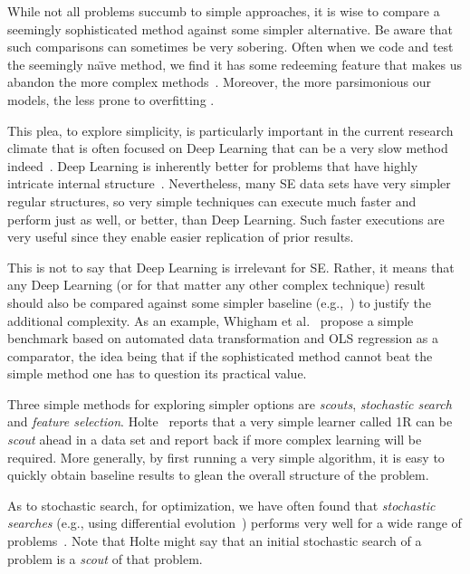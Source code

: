 \documentclass[preprint,10pt]{elsarticle}
\begin{document}
While not all problems succumb to simple approaches, it is wise to compare a seemingly sophisticated method against some simpler alternative. Be aware that such comparisons can sometimes be very sobering.  Often when we code and test the seemingly na\"{\i}ve method, we find it has some redeeming feature that makes us abandon the more complex methods~\cite{chen2018, fu2017, krishna18a}.   Moreover, the more parsimonious our models, the less prone to overfitting \cite{Hawk04}.
 
This plea, to explore simplicity, is particularly important in the current research climate that is often focused on  Deep Learning that can be a very slow method indeed~\cite{fu2017easy}. Deep Learning is inherently better for problems that have highly intricate internal structure~\cite{lecun2015deep}. Nevertheless, many SE data sets have very simpler regular structures, so very simple techniques can execute much faster and perform just as well, or better, than Deep Learning. Such faster executions are very useful since they enable easier replication of prior results.

This is not to say that Deep Learning is irrelevant for SE. Rather, it means that any Deep Learning (or for that matter any other complex technique) result should also be compared against some simpler baseline (e.g.,~\cite{fu2017}) to justify the additional complexity.  As an example, Whigham et al.~\cite{Whig15} propose a simple benchmark based on automated data transformation and OLS regression as a comparator, the idea being that if the sophisticated method cannot beat the simple method one has to question its practical value.

Three simple methods for exploring simpler options are {\em scouts}, {\em stochastic search} and {\em feature selection}. Holte~\cite{Holte1993} reports that a very simple learner called 1R can be {\em scout} ahead in a data set and report back if more complex learning will be required. More generally, by first running a very simple algorithm, it is easy to quickly obtain baseline results to glean the overall structure of the problem.

As to stochastic search, for optimization, we have often found that {\em stochastic searches} (e.g., using differential evolution~\cite{Storn1997}) performs very well for a wide range of problems~\cite{fu2016, agrawal16, agrawal18}.  Note that Holte might say that an initial stochastic search of a problem is a {\em scout} of that problem.
\end{document}
